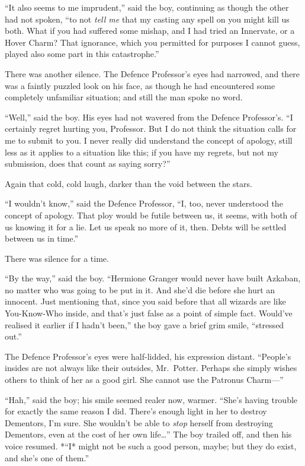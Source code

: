 ``It also seems to me imprudent,'' said the boy, continuing as though
the other had not spoken, ``to not \emph{tell me} that my casting any
spell on you might kill us both. What if you had suffered some mishap,
and I had tried an Innervate, or a Hover Charm? That ignorance, which
you permitted for purposes I cannot guess, played also some part in this
catastrophe.''

There was another silence. The Defence Professor's eyes had narrowed,
and there was a faintly puzzled look on his face, as though he had
encountered some completely unfamiliar situation; and still the man
spoke no word.

``Well,'' said the boy. His eyes had not wavered from the Defence
Professor's. ``I certainly regret hurting you, Professor. But I do not
think the situation calls for me to submit to you. I never really did
understand the concept of apology, still less as it applies to a
situation like this; if you have my regrets, but not my submission, does
that count as saying sorry?''

Again that cold, cold laugh, darker than the void between the stars.

``I wouldn't know,'' said the Defence Professor, ``I, too, never
understood the concept of apology. That ploy would be futile between us,
it seems, with both of us knowing it for a lie. Let us speak no more of
it, then. Debts will be settled between us in time.''

There was silence for a time.

``By the way,'' said the boy. ``Hermione Granger would never have built
Azkaban, no matter who was going to be put in it. And she'd die before
she hurt an innocent. Just mentioning that, since you said before that
all wizards are like You-Know-Who inside, and that's just false as a
point of simple fact. Would've realised it earlier if I hadn't been,''
the boy gave a brief grim smile, ``stressed out.''

The Defence Professor's eyes were half-lidded, his expression distant.
``People's insides are not always like their outsides, Mr.~Potter.
Perhaps she simply wishes others to think of her as a good girl. She
cannot use the Patronus Charm---''

``Hah,'' said the boy; his smile seemed realer now, warmer. ``She's
having trouble for exactly the same reason I did. There's enough light
in her to destroy Dementors, I'm sure. She wouldn't be able to
\emph{stop} herself from destroying Dementors, even at the cost of her
own life\ldots{}'' The boy trailed off, and then his voice resumed.
*``I* might not be such a good person, maybe; but they do exist, and
she's one of them.''

